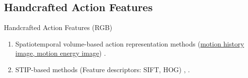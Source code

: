 \subsection{Handcrafted Action Features}
\begin{frame}{Handcrafted Action Features (RGB)}
    \begin{enumerate}
        \item<1-> Spatiotemporal volume-based action representation methods (\href{https://web.cse.ohio-state.edu/~davis.1719/CVL/Research/MHI/mhi.html}{motion history image, motion energy image}) \cite{li2011human}.
        \item<2-> STIP-based methods (Feature descriptors: SIFT, HOG) \cite{nguyen2014stap}, \cite{dalal2005histograms}.
\end{enumerate}
\end{frame}
